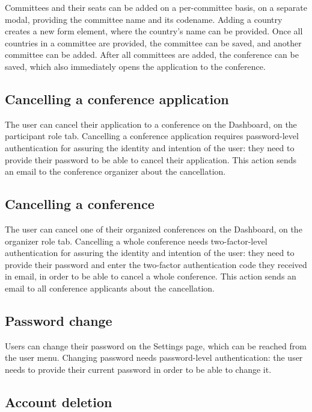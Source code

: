 Committees and their seats can be added on a per-committee basis, on a separate modal, providing the committee name and its codename. Adding a country creates a new form element, where the country's name can be provided. Once all countries in a committee are provided, the committee can be saved, and another committee can be added. After all committees are added, the conference can be saved, which also immediately opens the application to the conference.

\subsection{Cancelling a conference application}

The user can cancel their application to a conference on the Dashboard, on the participant role tab. Cancelling a conference application requires password-level authentication for assuring the identity and intention of the user: they need to provide their password to be able to cancel their application. This action sends an email to the conference organizer about the cancellation.

\subsection{Cancelling a conference}

The user can cancel one of their organized conferences on the Dashboard, on the organizer role tab. Cancelling a whole conference needs two-factor-level authentication for assuring the identity and intention of the user: they need to provide their password and enter the two-factor authentication code they received in email, in order to be able to cancel a whole conference. This action sends an email to all conference applicants about the cancellation.

\subsection{Password change}

Users can change their password on the Settings page, which can be reached from the user menu. Changing password needs password-level authentication: the user needs to provide their current password in order to be able to change it.

\subsection{Account deletion}

